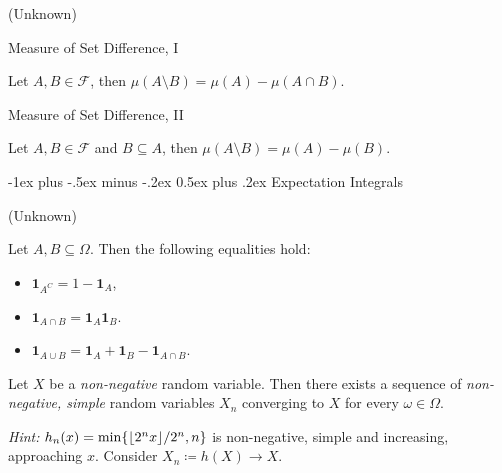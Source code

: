 \documentclass[10pt,landscape]{article}
\makeatletter
\newcommand{\Hint}{\textit{Hint: }}
\newcommand{\Indicator}[1]{\mathbf{1}_{#1}}
\newcommand{\CalF}{\mathcal{F}}
\DeclarePairedDelimiter\floor{\lfloor}{\rfloor}
\renewcommand{\section}{\@startsection{section}{1}{0mm}%
                                {-1ex plus -.5ex minus -.2ex}%
                                {0.5ex plus .2ex}%
                                {\normalfont\large\bfseries}}
\makeatother
\begin{document}
\begin{multicols}{3}
\begin{proposition}{(Unknown)}{}
\end{proposition}

\begin{proposition}{}{Measure of Set Difference, I}

    Let $A, B \in \CalF$, then $\mu(A \setminus B) = \mu(A) - \mu(A \cap B)$.

\end{proposition}

\begin{proposition}{}{Measure of Set Difference, II}

    Let $A, B \in \CalF$ and $B \subseteq A$, then $\mu(A \setminus B) = \mu(A) - \mu(B)$.

\end{proposition}


\section{Expectation Integrals}

\begin{proposition}{(Unknown)}{}

    Let $A,B \subseteq \Omega$. Then the following equalities hold:

        \begin{itemize}
            \setlength{\parskip}{0em}
            \item $\Indicator{A^C} = 1 - \Indicator{A}$,
            \item $\Indicator{A \cap B} = \Indicator{A}\Indicator{B}$.
            \item $\Indicator{A \cup B} = \Indicator{A} + \Indicator{B} - \Indicator{A \cap B}$.
        \end{itemize}

\end{proposition}

\begin{lemma}{3.3}{}

    Let $X$ be a \emph{non-negative} random variable. Then there exists a sequence of \emph{non-negative, simple} random variables $X_n$ converging to $X$ for every $\omega \in \Omega$.

    \Hint $h_n(x)=\min\{\floor{2^nx}/2^n, n\}$ is non-negative, simple and increasing, approaching $x$. Consider $X_n \coloneqq h(X) \to X$.

\end{lemma}


\end{multicols}
\end{document}
